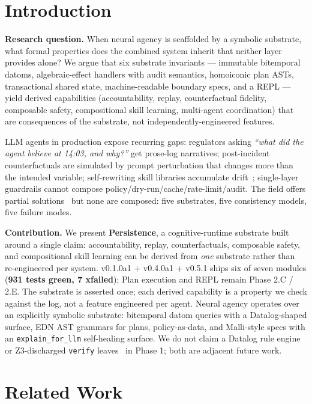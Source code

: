 \documentclass[anon]{nesy2026}   %
\newcommand{\C}[1]{\texttt{#1}}
\begin{document}
\section{Introduction}\label{sec:intro}

\textbf{Research question.} When neural agency is scaffolded by a symbolic substrate, what formal properties does the combined system inherit that neither layer provides alone? We argue that six substrate invariants --- immutable bitemporal datoms, algebraic-effect handlers with audit semantics, homoiconic plan ASTs, transactional shared state, machine-readable boundary specs, and a REPL --- yield derived capabilities (accountability, replay, counterfactual fidelity, composable safety, compositional skill learning, multi-agent coordination) that are consequences of the substrate, not independently-engineered features.

LLM agents in production expose recurring gaps: regulators asking \emph{``what did the agent believe at 14:03, and why?''} get prose-log narratives; post-incident counterfactuals are simulated by prompt perturbation that changes more than the intended variable; self-rewriting skill libraries accumulate drift~\citep{hannecke2026ssgm}; single-layer guardrails cannot compose policy/dry-run/cache/rate-limit/audit. The field offers partial solutions~\citep{kurtic2025zep,cheng2025pangolin,khattab2023dspy,wang2023voyager,anon2026camo} but none are composed: five substrates, five consistency models, five failure modes.

\textbf{Contribution.} We present \textbf{Persistence}, a cognitive-runtime substrate built around a single claim: accountability, replay, counterfactuals, composable safety, and compositional skill learning can be derived from \emph{one} substrate rather than re-engineered per system. v0.1.0a1 + v0.4.0a1 + v0.5.1 ships six of seven modules (\textbf{931 tests green, 7 xfailed}); Plan execution and REPL remain Phase 2.C / 2.E. The substrate is asserted once; each derived capability is a property we check against the log, not a feature engineered per agent. Neural agency operates over an explicitly symbolic substrate: bitemporal datom queries with a Datalog-shaped surface, EDN AST grammars for plans, policy-as-data, and Malli-style specs with an \C{explain\_for\_llm} self-healing surface. We do not claim a Datalog rule engine or Z3-discharged \C{verify} leaves~\citep{fan2024proofofthought} in Phase 1; both are adjacent future work.

\section{Related Work}\label{sec:related}
\end{document}
